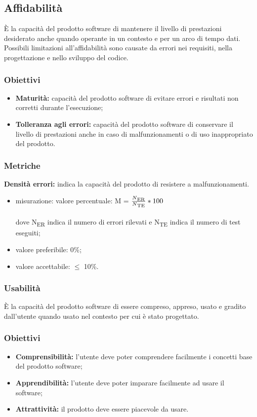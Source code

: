 \subsection{Affidabilità}
È la capacità del prodotto software di mantenere il livello di prestazioni
desiderato anche quando operante in un contesto e per un arco di tempo dati. Possibili
limitazioni all’affidabilità sono causate da errori nei requisiti, nella progettazione e nello
sviluppo del codice.
\subsubsection{Obiettivi}
\begin{itemize}
    \item \textbf{Maturità:} capacità del prodotto software di evitare errori e risultati non corretti durante l’esecuzione;
    \item \textbf{Tolleranza agli errori:} capacità del prodotto software di conservare il livello di prestazioni 
    anche in caso di malfunzionamenti o di uso inappropriato del prodotto.
\end{itemize}
\subsubsection{Metriche}
\textbf{Densità errori:} indica la capacità del prodotto di resistere a malfunzionamenti.
\begin{itemize}
    \item misurazione: valore percentuale: M = $\frac{N\textsubscript{ER}}{N\textsubscript{TE}}*100$ \\
    \\dove N\textsubscript{ER} indica il numero di errori rilevati e N\textsubscript{TE} indica il numero di test eseguiti;
    \item valore preferibile: 0\%;
    \item valore accettabile: $\leq$ 10\%.
\end{itemize}
\subsubsection{Usabilità}
È la capacità del prodotto software di essere compreso, appreso, usato e gradito dall’utente quando usato nel contesto per cui è stato progettato.
\subsubsection{Obiettivi}
\begin{itemize}
    \item \textbf{Comprensibilità:} l'utente deve poter comprendere facilmente i concetti base del prodotto software;
    \item \textbf{Apprendibilità:} l'utente deve poter imparare facilmente ad usare il software;
    \item \textbf{Attrattività:} il prodotto deve essere piacevole da usare.
\end{itemize}
